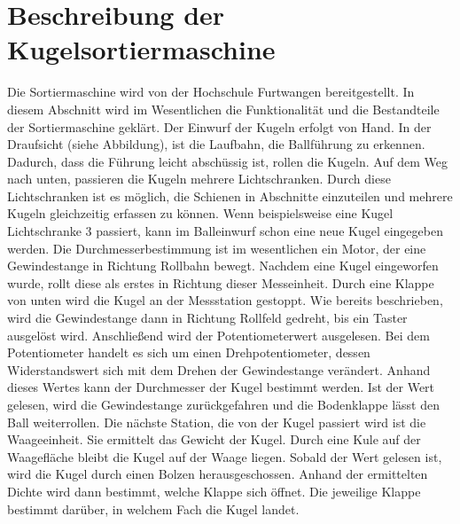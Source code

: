 \section{Beschreibung der Kugelsortiermaschine}
Die Sortiermaschine wird von der Hochschule Furtwangen bereitgestellt. In diesem Abschnitt wird im Wesentlichen die Funktionalität und die Bestandteile der Sortiermaschine geklärt.
Der Einwurf der Kugeln erfolgt von Hand. In der Draufsicht (siehe Abbildung), ist die Laufbahn, die Ballführung zu erkennen. Dadurch, dass die Führung leicht abschüssig ist, rollen die Kugeln. Auf dem Weg nach unten, passieren die Kugeln mehrere Lichtschranken. Durch diese Lichtschranken ist es möglich, die Schienen in Abschnitte einzuteilen und mehrere Kugeln gleichzeitig erfassen zu können. Wenn beispielsweise eine Kugel Lichtschranke 3 passiert, kann im Balleinwurf schon eine neue Kugel eingegeben werden. Die Durchmesserbestimmung ist im wesentlichen ein Motor, der eine Gewindestange in Richtung Rollbahn bewegt. Nachdem eine Kugel eingeworfen wurde, rollt diese als erstes in Richtung dieser Messeinheit. Durch eine Klappe von unten wird die Kugel an der Messstation gestoppt. Wie bereits beschrieben, wird die Gewindestange dann in Richtung Rollfeld gedreht, bis ein Taster ausgelöst wird. Anschließend wird der Potentiometerwert ausgelesen. Bei dem Potentiometer handelt es sich um einen Drehpotentiometer, dessen Widerstandswert sich mit dem Drehen der Gewindestange verändert. Anhand dieses Wertes kann der Durchmesser der Kugel bestimmt werden. Ist der Wert gelesen, wird die Gewindestange zurückgefahren und die Bodenklappe lässt den Ball weiterrollen. Die nächste Station, die von der Kugel passiert wird ist die Waageeinheit. Sie ermittelt das Gewicht der Kugel. Durch eine Kule auf der Waagefläche bleibt die Kugel auf der Waage liegen. Sobald der Wert gelesen ist, wird die Kugel durch einen Bolzen herausgeschossen. Anhand der ermittelten Dichte wird dann bestimmt, welche Klappe sich öffnet. Die jeweilige Klappe bestimmt darüber, in welchem Fach die Kugel landet.
